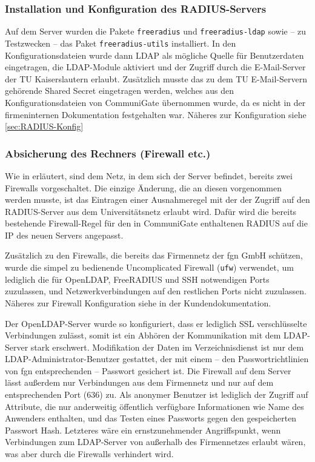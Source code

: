 \documentclass[11pt,a4paper,titlepage=firstiscover,headsepline,bibtotoc]{scrartcl} %
\begin{document}
\subsubsection{Installation und Konfiguration des RADIUS-Servers}\label{sec:RADIUS-Konf}
Auf dem Server wurden die Pakete \texttt{freeradius} und \texttt{freeradius-ldap} sowie -- zu Testzwecken -- das Paket \texttt{freeradius-utils} installiert. In den Konfigurationsdateien wurde dann LDAP als mögliche Quelle für Benutzerdaten eingetragen, die LDAP-Module aktiviert und der Zugriff durch die E-Mail-Server der TU Kaiserslautern erlaubt. Zusätzlich musste das zu dem TU E-Mail-Servern gehörende Shared Secret eingetragen werden, welches aus den Konfigurationsdateien von CommuniGate übernommen wurde, da es nicht in der firmeninternen Dokumentation festgehalten war. Näheres zur Konfiguration siehe \autoref{sec:RADIUS-Konfig}

\subsubsection{Absicherung des Rechners (Firewall etc.)}
Wie in  erläutert, sind dem Netz, in dem sich der Server befindet, bereits zwei Firewalls vorgeschaltet. Die einzige Änderung, die an diesen vorgenommen werden musste, ist das Eintragen einer Ausnahmeregel mit der der Zugriff auf den RADIUS-Server aus dem Universitätsnetz erlaubt wird. Dafür wird die bereits bestehende Firewall-Regel für den in CommuniGate enthaltenen RADIUS auf die IP des neuen Servers angepasst.

Zusätzlich zu den Firewalls, die bereits das Firmennetz der fgn GmbH schützen, wurde die simpel zu bedienende Uncomplicated Firewall (\texttt{ufw}) verwendet, um lediglich die für OpenLDAP, FreeRADIUS und SSH notwendigen Ports zuzulassen, und Netzwerkverbindungen auf den restlichen Ports nicht zuzulassen. Näheres zur Firewall Konfiguration siehe  in der Kundendokumentation.

Der OpenLDAP-Server wurde so konfiguriert, dass er lediglich SSL verschlüsselte Verbindungen zulässt, somit ist ein Abhören der Kommunikation mit dem LDAP-Server stark erschwert. Modifikation der Daten im Verzeichnisdienst ist nur dem LDAP-Administrator-Benutzer gestattet, der mit einem -- den Passwortrichtlinien von fgn entsprechenden -- Passwort gesichert ist. Die Firewall auf dem Server lässt außerdem nur Verbindungen aus dem Firmennetz und nur auf dem entsprechenden Port (636) zu. Als anonymer Benutzer ist lediglich der Zugriff auf Attribute, die nur anderweitig öffentlich verfügbare Informationen wie Name des Anwenders enthalten, und das Testen eines Passworts gegen den gespeicherten Passwort Hash. Letzteres wäre ein ernstzunehmender Angriffspunkt, wenn Verbindungen zum LDAP-Server von außerhalb des Firmennetzes erlaubt wären, was aber durch die Firewalls verhindert wird.
\end{document}
